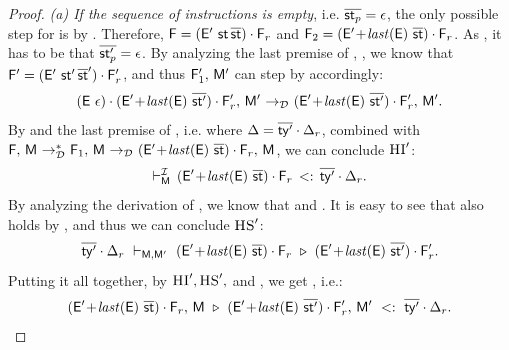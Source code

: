{\begin{proof}
{  \emph{(a) If the sequence of instructions is empty},
  i.e. $\overline{\mathsf{st}_p} = \epsilon$, the only possible step for 
  is by . Therefore, $\mathsf{F} = (\mathsf{E}'\ \mathsf{st}\,\overline{\mathsf{st}}) \cdot \mathsf{F}_r$
  and $\frm_2 = \stk{(\env'\!+\!\last{\env}\ \ol\st)}{\frm_r}$.
  As , it has to be that
  $\overline{\mathsf{st}'_p} = \epsilon$. By analyzing the last premise of ,
  , we know that
  $\mathsf{F}' = (\mathsf{E}'\ \mathsf{st}'\,{\overline{\mathsf{st}}'}) \cdot \mathsf{F}'_r$, and thus
  $\mathsf{F}'_1,\, \mathsf{M}'$ can step by  accordingly:
  \[
    \config{\stk{(\env\ \done)}{\stk{(\env'\!+\!\last{\env}\ \ol{\st'})}{\frm'_r}}}{\mtbl'}
    \stepd
    \config{\stk{(\env'\!+\!\last{\env}\ \ol{\st'})}{\frm'_r}}{\mtbl'}.
  \]
  By  and the last premise of , i.e.
  where $\Delta = \overline{\mathsf{ty}'} \cdot \Delta_r$,
  combined with $\config{\frm}{\mtbl} \stepdmul \config{\frm_1}{\mtbl}
    \stepd \config{\stk{(\env'\!+\!\last{\env}\ \ol\st)}{\frm_r}}{\mtbl}$,
  we can conclude $\textsc{HI}'$:
  \[
    \typeinfstd{\stk{(\env'\!+\!\last{\env}\ \ol\st)}{\frm_r}}{\stk{\ol{\ty'}}{\Delta_r}}.
  \]
  By analyzing the derivation  of ,
  we know that  and
  .
  It is easy to see that
  also holds by , and thus we can conclude $\textsc{HS}'$:
  \[
    \overline{\mathsf{ty}'} \cdot \Delta_r\ \vdash_{\mathsf{M},\mathsf{M}'}\ (\mathsf{E}'\!+\!\mathit{last}(\mathsf{E})\ \overline{\mathsf{st}}) \cdot \mathsf{F}_r\ \triangleright\ (\mathsf{E}'\!+\!\mathit{last}(\mathsf{E})\ \overline{\mathsf{st}'}) \cdot \mathsf{F}'_r.
  \]
  Putting it all together, by $\textsc{HI}', \textsc{HS}',$ and ,
  we get , i.e.:
  \[
    (\mathsf{E}'\!+\!\mathit{last}(\mathsf{E})\ \overline{\mathsf{st}}) \cdot \mathsf{F}_r,\, \mathsf{M}\ \triangleright\ (\mathsf{E}'\!+\!\mathit{last}(\mathsf{E})\ \overline{\mathsf{st}'}) \cdot \mathsf{F}'_r,\, \mathsf{M}'\ <:\ \overline{\mathsf{ty}'} \cdot \Delta_r.
  \]

}
\end{proof}}
